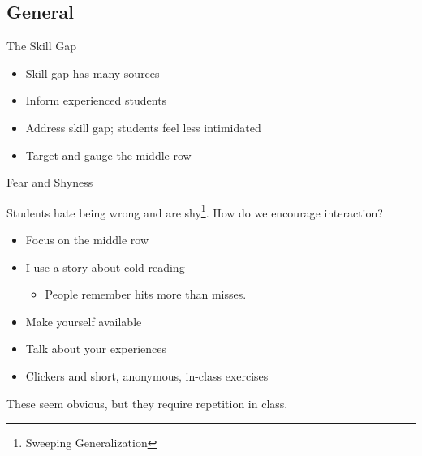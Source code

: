 \documentclass[11pt]{beamer}
\begin{document}
\subsection{General}

\begin{frame}{The Skill Gap}
	\begin{itemize}
		\item Skill gap has many sources
		\item Inform experienced students
		\item Address skill gap; students feel less intimidated
		\item Target and gauge the middle row
	\end{itemize}
\end{frame}



\begin{frame}{Fear and Shyness}
	
	Students hate being wrong and are shy\footnote{Sweeping Generalization}.  How do we encourage interaction?
	\pause
	\begin{itemize}
		\item Focus on the middle row
		\pause
		
		\item I use a story about cold reading
		\begin{itemize}
			\item People remember hits more than misses.
		\end{itemize}
		\pause
		
		\item Make yourself available 
		\pause
				
		\item Talk about your experiences
		\pause
		\item Clickers and short, anonymous, in-class exercises
	\end{itemize}
	\pause
	These seem obvious, but they require repetition in class.
\end{frame}
\end{document}
